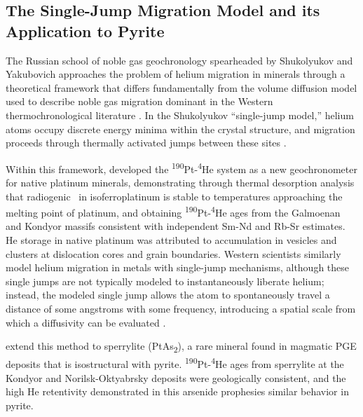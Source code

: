 \subsection{The Single-Jump Migration Model and its Application to Pyrite}

The Russian school of noble gas geochronology spearheaded by
Shukolyukov and Yakubovich approaches the problem of helium migration
in minerals through a theoretical framework that differs fundamentally
from the volume diffusion model used to describe noble gas migration
dominant in the Western thermochronological literature \citep{dodson1973,
harrison1985,fortiergiletti1989,lovera1991,wolf1996,farley2000,lee1997}. In the Shukolyukov
``single-jump model,'' helium atoms occupy discrete energy minima within
the crystal structure, and migration proceeds through thermally
activated jumps between these sites \citep{shukolyukov2009,yakubovich2010}.

Within this framework, \citet{shukolyukov2012} developed the \textsuperscript{190}Pt-\textsuperscript{4}He
system as a new geochronometer for native platinum minerals,
demonstrating through thermal desorption analysis that radiogenic \He\ in
isoferroplatinum is stable to temperatures approaching the melting point
of platinum, and obtaining \textsuperscript{190}Pt-\textsuperscript{4}He ages from the Galmoenan and Kondyor
massifs consistent with independent Sm-Nd and Rb-Sr estimates. He
storage in native platinum was attributed to accumulation in vesicles
and clusters at dislocation cores and grain boundaries. Western scientists
similarly model helium migration in metals with single-jump mechanisms, although these single jumps are not typically modeled to
instantaneously liberate helium; instead, the modeled single jump allows
the atom to spontaneously travel a distance of some angstroms with some
frequency, introducing a spatial scale from which a diffusivity can be
evaluated \citep{ratzke1992,costhickman1975,wilson1973}.

\citet{yakubovich2015} extend this method to sperrylite (PtAs\textsubscript{2}), a
rare mineral found in magmatic PGE deposits that is isostructural with
pyrite. \textsuperscript{190}Pt-\textsuperscript{4}He ages from sperrylite at the Kondyor and
Norilsk-Oktyabrsky deposits were geologically consistent, and the high
He retentivity demonstrated in this arsenide prophesies similar behavior
in pyrite.

